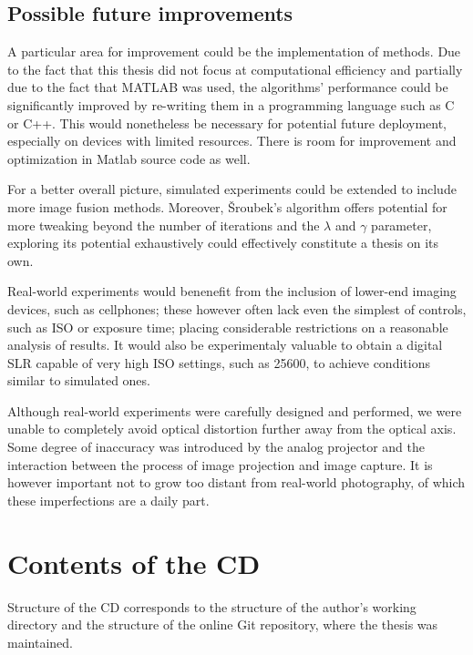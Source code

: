 \documentclass[12pt,notitlepage]{report}
\begin{document}
\section{Possible future improvements}

A particular area for improvement could be the implementation of methods. Due to the fact that this thesis did not focus at computational efficiency and partially due to the fact that MATLAB was used, the algorithms' performance could be significantly improved by re-writing them in a programming language such as C or C++. This would nonetheless be necessary for potential future deployment, especially on devices with limited resources. There is room for improvement and optimization in Matlab source code as well. 

For a better overall picture, simulated experiments could be extended to include more image fusion methods. Moreover, Šroubek's algorithm offers potential for more tweaking beyond the number of iterations and the $\lambda$ and $\gamma$ parameter, exploring its potential exhaustively could effectively constitute a thesis on its own.

Real-world experiments would benenefit from the inclusion of lower-end imaging devices, such as cellphones; these however often lack even the simplest of controls, such as ISO or exposure time; placing considerable restrictions on a reasonable analysis of results. It would also be experimentaly valuable to obtain a digital SLR capable of very high ISO settings, such as 25600, to achieve conditions similar to simulated ones. 

Although real-world experiments were carefully designed and performed, we were unable to completely avoid optical distortion further away from the optical axis. Some degree of inaccuracy was introduced by the analog projector and the interaction between the process of image projection and image capture. It is however important not to grow too distant from real-world photography, of which these imperfections are a daily part. 

\appendix

\chapter{Contents of the CD}

Structure of the CD corresponds to the structure of the author's working directory and the structure of the online Git repository, where the thesis was maintained. 
\end{document}
